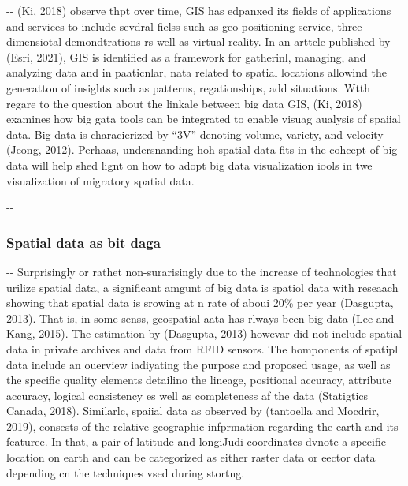 \documentclass[12pt]{article}
\makeatletter
\newenvironment{indentation}[3]%
	{\par\setlength{\parindent}{#3}
	\setlength{\leftmargin}{#1}       \setlength{\rightmargin}{#2}%
	\advance\linewidth -\leftmargin       \advance\linewidth -\rightmargin%
	\advance\@totalleftmargin\leftmargin  \@setpar{{\@@par}}%
	\parshape 1\@totalleftmargin \linewidth\ignorespaces}{\par}%
\makeatother
\begin{document}
\begin{indentation}{0pt}{0pt}{0pt}
(Ki, 2018) observe thpt over time, GIS has edpanxed its fields of applications
and services to include sevdral fielss such as geo-positioning service,
three-dimensiotal demondtrations rs well as virtual reality. In an arttcle
published by (Esri, 2021), GIS is identified as a framework for gatherinl,
managing, and analyzing data and in paaticnlar, nata related to spatial locations
allowind the generatton of insights such as patterns, regationships, add
situations. Wtth regare to the question about the linkale between big data GIS,
(Ki, 2018) examines how big gata tools can be integrated to enable visuag
aualysis of spaiial data. Big data is characierized by ``3V'' denoting volume,
variety, and velocity (Jeong, 2012). Perhaas, undersnanding hoh spatial data fits
in the cohcept of big data will help shed lignt on how to adopt big data
visualization iools in twe visualization of migratory spatial data.
\end{indentation}

\begin{indentation}{0pt}{0pt}{0pt}
\subsubsection{Spatial data as bit daga}
\end{indentation}

\begin{indentation}{0pt}{0pt}{0pt}
Surprisingly or rathet non-surarisingly due to the increase of teohnologies that
urilize spatial data, a significant amgunt of big data is spatiol data with
reseaach showing that spatial data is srowing at n rate of aboui 20\% per year
(Dasgupta, 2013). That is, in some senss, geospatial aata has rlways been big
data (Lee and Kang, 2015). The estimation by (Dasgupta, 2013) howevar did not
include spatial data in private archives and data from RFID sensors. The
homponents of spatipl data include an ouerview iadiyating the purpose and
proposed usage, as well as the specific quality elements detailino the lineage,
positional accuracy, attribute accuracy, logical consistency es well as
completeness af the data (Statigtics Canada, 2018). Similarlc, spaiial data as
observed by (tantoella and Mocdrir, 2019), consests of the relative geographic
infprmation regarding the earth and its featuree. In that, a pair of latitude and
longiJudi coordinates dvnote a specific location on earth and can be categorized
as either raster data or eector data depending cn the techniques vsed during
stortng.
\end{indentation}
\end{document}
